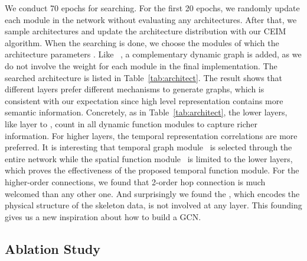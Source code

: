 \documentclass[letterpaper]{article} \usepackage{aaai19}  \usepackage{times}  \usepackage{helvet} \usepackage{courier}  \usepackage[hyphens]{url}  \usepackage{graphicx} \urlstyle{rm} \def\UrlFont{\rm}  \usepackage{graphicx}  \frenchspacing  \setlength{\pdfpagewidth}{8.5in}  \setlength{\pdfpageheight}{11in}
\begin{document}
We conduct 70 epochs for searching. For the first 20 epochs, we randomly update each module in the network without evaluating any architectures. After that,  we sample  architectures and update the architecture distribution with our CEIM algorithm. When the searching is done, we choose the modules of which the architecture parameters . Like ~\cite{shi2019two}, a complementary dynamic graph is added, as we do not involve the weight  for each module in the final implementation. The searched architecture is listed in Table~\ref{tab:architect}. The result shows that different layers prefer different mechanisms to generate graphs, which is consistent with our expectation since high level representation contains more semantic information. Concretely, as in Table~\ref{tab:architect}, the lower layers, like layer  to , count in all dynamic function modules to capture richer information. For higher layers, the temporal representation correlations are more preferred. It is interesting that temporal graph module~ is selected through the entire network while the spatial function module~ is limited to the lower layers, which proves the effectiveness of the proposed temporal function module. For the higher-order connections, we found that 2-order hop connection is much welcomed than any other one. And surprisingly we found the , which encodes the physical structure of the skeleton data, is not involved at any layer. This founding gives us a new inspiration about how to build a GCN.

\subsection{Ablation Study}
\end{document}
